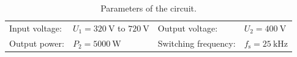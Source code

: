 \begin{table}[ht]
	\centering  %
	\begin{tabular}{llll}
		\toprule

		Input voltage: & $U_{\mathrm{1}} = \SI{320}{\volt}$ to $\SI{720}{\volt}$ & Output voltage:      & $U_{\mathrm{2}} = \SI{400}{\volt}$      \\
		Output power:  & $P_2 = \SI{5000}{\watt}$                                & Switching frequency: & $f_{\mathrm{s}} = \SI{25}{\kilo\hertz}$ \\
		\bottomrule
	\end{tabular}
	\caption{Parameters of the circuit.}  %
	\label{table:Parameters of the buck-boost converter.}
\end{table}